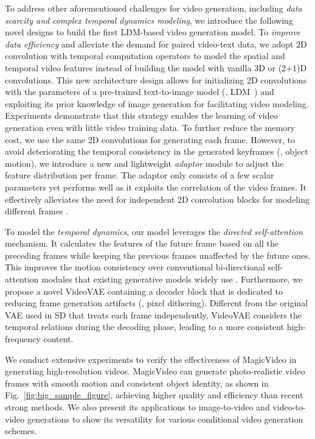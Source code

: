 \documentclass[10pt,twocolumn,letterpaper]{article}
\newcommand{\tit}[1]{\textit{#1}}
\begin{document}
To address other aforementioned challenges   for video generation, including \tit{data scarcity and complex temporal dynamics modeling},  we introduce  the following novel designs  to build the first LDM-based video generation model. To \tit{improve data efficiency} and alleviate the demand for paired video-text data,  we adopt 2D convolution  with temporal computation operators to model the spatial and temporal video features  instead of building the model  with vanilla 3D \cite{ho_video_2022} or (2+1)D \cite{singer_make--video_2022} convolutions.  This new architecture design allows for initializing 2D convolutions with the parameters of a pre-trained text-to-image model (\eg, LDM~\cite{rombach_high-resolution_2022}) and exploiting its prior knowledge of image generation for facilitating video modeling. Experiments demonstrate that this strategy enables the learning of video generation even with little video training data. To further reduce the memory cost, we use the same 2D convolutions for generating each frame. However, to avoid  deteriorating the temporal consistency in the generated keyframes (\eg, object motion),    we introduce a new and lightweight \textit{adaptor} module to adjust the feature distribution per frame. The adaptor only consists of a few scalar parameters yet performs well as it exploits the   correlation of  the video frames. It effectively alleviates the need for  independent    2D convolution blocks for modeling different frames \cite{lin2022frozen}. 

To   model the  \textit{temporal dynamics}, our model leverages the \textit{directed self-attention} mechanism. It calculates  the features of the future frame    based on all the preceding frames while keeping the previous frames   unaffected by the future ones. This improves the motion consistency over conventional bi-directional self-attention modules that existing generative models widely use \cite{singer_make--video_2022, imagen, rombach_high-resolution_2022, dalle2}. Furthermore,  we propose a novel VideoVAE containing a decoder block that is dedicated to reducing frame generation artifacts (\eg, pixel dithering). Different from the original VAE used in SD that treats each frame independently, VideoVAE considers the temporal relations during the decoding phase, leading to a more consistent high-frequency content.


We conduct extensive experiments to verify the effectiveness of MagicVideo in generating high-resolution videos.   MagicVideo can generate photo-realistic video frames with  smooth motion and   consistent object identity, as shown in Fig.~\ref{fig:big_sample_figure}, achieving higher quality and efficiency than recent strong methods.  We also present its applications to image-to-video and video-to-video generations  to show  its versatility for various conditional video generation schemes.  
\end{document}
